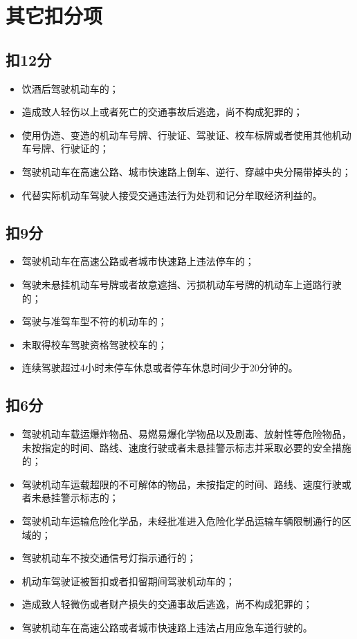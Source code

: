 \section{其它扣分项}

\subsection*{扣12分}

\begin{itemize}
    \item 饮酒后驾驶机动车的；
    \item 造成致人轻伤以上或者死亡的交通事故后逃逸，尚不构成犯罪的；
    \item 使用伪造、变造的机动车号牌、行驶证、驾驶证、校车标牌或者使用其他机动车号牌、行驶证的；
    \item 驾驶机动车在高速公路、城市快速路上倒车、逆行、穿越中央分隔带掉头的；
    \item 代替实际机动车驾驶人接受交通违法行为处罚和记分牟取经济利益的。
\end{itemize}

\subsection*{扣9分}

\begin{itemize}
    \item 驾驶机动车在高速公路或者城市快速路上违法停车的；
    \item 驾驶未悬挂机动车号牌或者故意遮挡、污损机动车号牌的机动车上道路行驶的；
    \item 驾驶与准驾车型不符的机动车的；
    \item 未取得校车驾驶资格驾驶校车的；
    \item 连续驾驶超过4小时未停车休息或者停车休息时间少于20分钟的。
\end{itemize}

\subsection*{扣6分}

\begin{itemize}
    \item 驾驶机动车载运爆炸物品、易燃易爆化学物品以及剧毒、放射性等危险物品，未按指定的时间、路线、速度行驶或者未悬挂警示标志并采取必要的安全措施的；
    \item 驾驶机动车运载超限的不可解体的物品，未按指定的时间、路线、速度行驶或者未悬挂警示标志的；
    \item 驾驶机动车运输危险化学品，未经批准进入危险化学品运输车辆限制通行的区域的；
    \item 驾驶机动车不按交通信号灯指示通行的；
    \item 机动车驾驶证被暂扣或者扣留期间驾驶机动车的；
    \item 造成致人轻微伤或者财产损失的交通事故后逃逸，尚不构成犯罪的；
    \item 驾驶机动车在高速公路或者城市快速路上违法占用应急车道行驶的。
\end{itemize}

